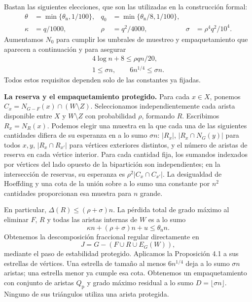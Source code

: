 \documentclass[spanish,11pt,a4paper]{article}
\begin{document}
Bastan las siguientes elecciones, que son las utilizadas en la construcción formal: \[\begin{aligned}
\theta&=\min\{\theta_{\mathrm n},1/100\},&
q_0&=\min\{\theta_{\mathrm n}/8,1/100\},\\
\kappa&=q/1000,&
\rho&=q^2/4000,&
\sigma&=\rho^4q^2/10^4.
\end{aligned}\] Aumentamos \(N_0\) para cumplir los umbrales de muestreo y empaquetamiento que aparecen a continuación y para asegurar \[\begin{gathered}
4\log n+8\le\rho qn/20,\\
1\le\sigma n,\qquad 6n^{1/4}\le\sigma n.
\end{gathered}\] Todos estos requisitos dependen solo de las constantes ya fijadas.

\textbf{La reserva y el empaquetamiento protegido.} Para cada \(x\in X\), ponemos \(C_x=N_{G-F}(x)\cap(W\setminus Z)\). Seleccionamos independientemente cada arista disponible entre \(X\) y \(W\setminus Z\) con probabilidad \(\rho\), formando \(R\). Escribimos \(R_x=N_R(x)\). Podemos elegir una muestra en la que cada una de las siguientes cantidades difiera de su esperanza en a lo sumo \(\sigma n\): \(|R_x|\), \(|R_x\cap N_G(y)|\) para todos \(x,y\), \(|R_x\cap R_{x'}|\) para vértices exteriores distintos, y el número de aristas de reserva en cada vértice interior. Para cada cantidad fija, los sumandos indexados por vértices del lado opuesto de la bipartición son independientes; en la intersección de reservas, su esperanza es \(\rho^2|C_x\cap C_{x'}|\). La desigualdad de Hoeffding y una cota de la unión sobre a lo sumo una constante por \(n^2\) cantidades proporcionan esa muestra para \(n\) grande.

En particular, \(\Delta(R)\le(\rho+\sigma)n\). La pérdida total de grado máximo al eliminar \(F\), \(R\) y todas las aristas internas de \(W\) es a lo sumo \[\kappa n+(\rho+\sigma)n+u\le\theta_{\mathrm n}n.\] Obtenemos la descomposición fraccional regular directamente en \[J=G-(F\cup R\cup E_G(W)),
\tag{A.4}\] mediante el paso de estabilidad protegido. Aplicamos la Proposición 4.1 a sus estrellas de vértices. Una estrella de tamaño al menos \(6n^{1/4}\) deja a lo sumo \(\sigma n\) aristas; una estrella menor ya cumple esa cota. Obtenemos un empaquetamiento con conjunto de aristas \(Q_{\mathrm p}\) y grado máximo residual a lo sumo \(D=\lfloor\sigma n\rfloor\). Ninguno de sus triángulos utiliza una arista protegida.
\end{document}
